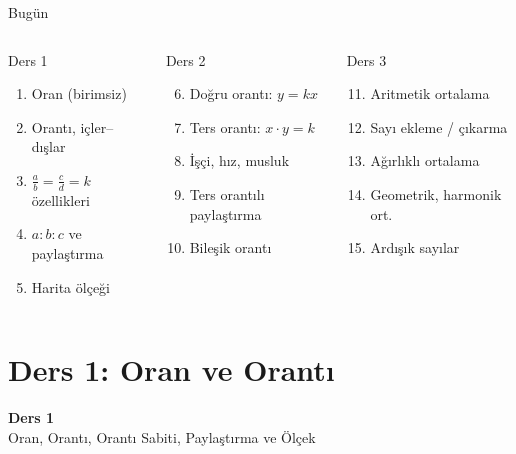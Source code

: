 \documentclass[aspectratio=169,11pt]{beamer}
\begin{document}
\begin{frame}{Bugün}
\begin{columns}[t]
\begin{block}{Ders 1}
\begin{enumerate}
\item Oran (birimsiz)
\item Orantı, içler--dışlar
\item \(\frac{a}{b}=\frac{c}{d}=k\) özellikleri
\item \(a:b:c\) ve paylaştırma
\item Harita ölçeği
\end{enumerate}
\end{block}
\begin{block}{Ders 2}
\begin{enumerate}\setcounter{enumi}{5}
\item Doğru orantı: \(y=kx\)
\item Ters orantı: \(x\cdot y=k\)
\item İşçi, hız, musluk
\item Ters orantılı paylaştırma
\item Bileşik orantı
\end{enumerate}
\end{block}
\begin{block}{Ders 3}
\begin{enumerate}\setcounter{enumi}{10}
\item Aritmetik ortalama
\item Sayı ekleme / çıkarma
\item Ağırlıklı ortalama
\item Geometrik, harmonik ort.
\item Ardışık sayılar
\end{enumerate}
\end{block}
\end{columns}
\end{frame}

\section{Ders 1: Oran ve Orantı}
\begin{frame}
\centering\Large\color{anamavi}\textbf{Ders 1}\\[6pt]\normalsize Oran, Orantı, Orantı Sabiti, Paylaştırma ve Ölçek
\end{frame}
\end{document}
